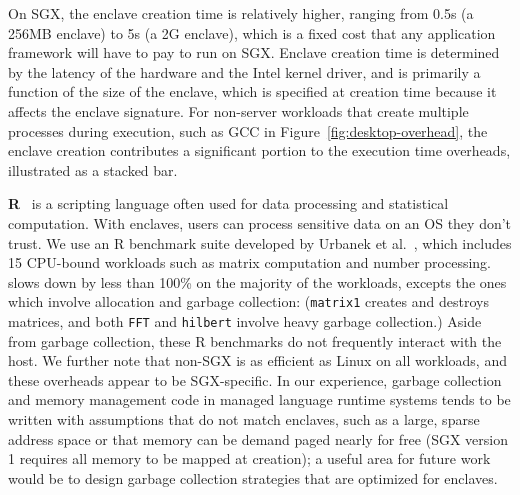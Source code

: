 On SGX, the enclave creation time is relatively higher,  ranging from 0.5s (a 256MB enclave) to 5s (a 2G enclave), which is a fixed cost that any application framework
will have to pay to run on SGX.
Enclave creation time is determined by the latency of the hardware and the Intel kernel driver, and is primarily a function of the size of 
the enclave, which is specified at creation time because it affects the enclave signature. %
For non-server workloads that create multiple processes during execution,
such as GCC in Figure~\ref{fig:desktop-overhead},
the enclave creation contributes a significant portion to the execution time overheads, illustrated as a stacked bar.

{\bf R}~\cite{r-project} is a scripting language often used for
data processing and statistical computation.
With enclaves, users can process sensitive data on an
OS they don't trust.
We use an R benchmark suite developed by Urbanek et al.~\cite{r-benchmark-25}, which includes 15 CPU-bound workloads such as matrix computation and number processing.
\graphenesgx{} slows down by less than 100\% on the majority of the workloads, excepts the ones which involve allocation and garbage collection: ({\tt matrix1} creates and destroys matrices, and both {\tt FFT} and {\tt hilbert} involve heavy garbage collection.)
Aside from garbage collection, these R benchmarks do not frequently interact with the host.
We further note that non-SGX \graphene{} is as efficient as Linux on all workloads, 
and these overheads appear to be SGX-specific.
In our experience, garbage collection and memory management code in managed language runtime
systems tends to be written with assumptions that do not match enclaves,
such as a large, sparse address space or that memory can be demand paged 
nearly for free (SGX version 1 requires all memory to be mapped
at creation); a useful area for future work would be to design
garbage collection strategies that are optimized for enclaves.
 
